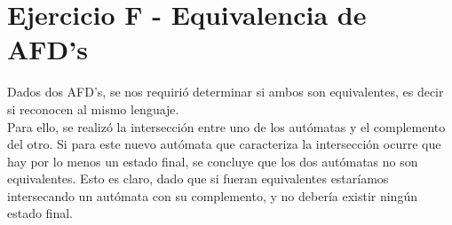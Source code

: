 \section{Ejercicio F - Equivalencia de AFD's}
\indent \indent Dados dos AFD's, se nos requirió determinar si ambos son equivalentes, es decir si reconocen al mismo lenguaje.\\
\indent Para ello, se realizó la intersección entre uno de los autómatas y el complemento del otro. Si para este nuevo autómata que caracteriza la intersección ocurre que hay por lo menos un estado final, se concluye que los dos autómatas no son equivalentes. Esto es claro, dado que si fueran equivalentes estaríamos intersecando un autómata con su complemento, y no debería existir ningún estado final.\\
